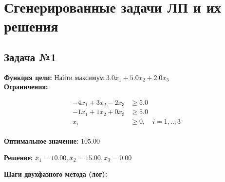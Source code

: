 \documentclass[a4paper,12pt]{article}
\begin{document}
\section*{Сгенерированные задачи ЛП и их решения}

\subsection*{Задача №1}
\textbf{Функция цели: }
Найти максимум $ 3.0x_{1} +5.0x_{2} +2.0x_{3} $\\

\textbf{Ограничения:}

\[ \begin{aligned}
-4x_{1} +3x_{2} -2x_{3} &\ge 5.0 \\
-1x_{1} +1x_{2} +0x_{3} &\ge 5.0 \\
x_i &\ge 0,\quad i=1,..,3\\
\end{aligned}\]

\textbf{Оптимальное значение: }$105.00$

\textbf{Решение: }$x_{1}=10.00, x_{2}=15.00, x_{3}=0.00$

\textbf{Шаги двухфазного метода (лог):}
\end{document}
